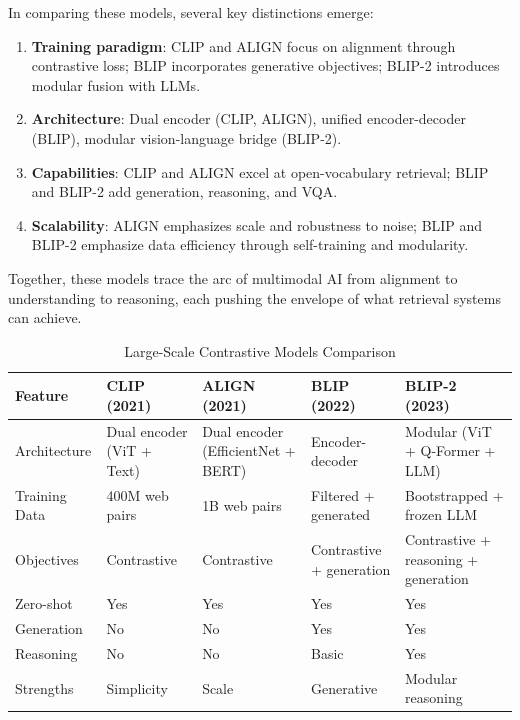 \documentclass[conference]{IEEEtran}
\begin{document}
In comparing these models, several key distinctions emerge:

\begin{enumerate}
  \item \textbf{Training paradigm}: CLIP and ALIGN focus on alignment through contrastive loss; BLIP incorporates generative objectives; BLIP-2 introduces modular fusion with LLMs.
  
  \item \textbf{Architecture}: Dual encoder (CLIP, ALIGN), unified encoder-decoder (BLIP), modular vision-language bridge (BLIP-2).
  
  \item \textbf{Capabilities}: CLIP and ALIGN excel at open-vocabulary retrieval; BLIP and BLIP-2 add generation, reasoning, and VQA.
  
  \item \textbf{Scalability}: ALIGN emphasizes scale and robustness to noise; BLIP and BLIP-2 emphasize data efficiency through self-training and modularity.
\end{enumerate}

Together, these models trace the arc of multimodal AI from alignment to understanding to reasoning, each pushing the envelope of what retrieval systems can achieve.

\begin{table}[ht]
\centering
\caption{Large-Scale Contrastive Models Comparison}
\label{tab:contrastive}
\small
\setlength{\tabcolsep}{4pt}
\begin{tabularx}{\columnwidth}{@{}>{\raggedright\arraybackslash}X>{\raggedright\arraybackslash}X>{\raggedright\arraybackslash}X>{\raggedright\arraybackslash}X>{\raggedright\arraybackslash}X@{}}
\toprule
\textbf{Feature} & \textbf{CLIP (2021)} & \textbf{ALIGN (2021)} & \textbf{BLIP (2022)} & \textbf{BLIP-2 (2023)} \\
\midrule
Architecture & Dual encoder (ViT + Text) & Dual encoder (EfficientNet + BERT) & Encoder-decoder & Modular (ViT + Q-Former + LLM) \\
Training Data & 400M web pairs & 1B web pairs & Filtered + generated & Bootstrapped + frozen LLM \\
Objectives & Contrastive & Contrastive & Contrastive + generation & Contrastive + reasoning + generation \\
Zero-shot & Yes & Yes & Yes & Yes \\
Generation & No & No & Yes & Yes \\
Reasoning & No & No & Basic & Yes \\
Strengths & Simplicity & Scale & Generative & Modular reasoning \\
\bottomrule
\end{tabularx}
\end{table}
\end{document}
